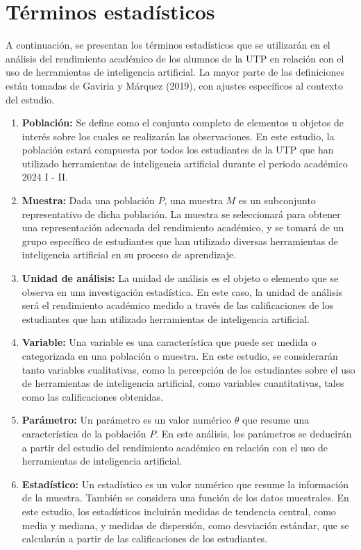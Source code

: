 \documentclass{article}
\begin{document}
\newpage

\section{Términos estadísticos}

A continuación, se presentan los términos estadísticos que se utilizarán en el análisis del rendimiento académico de los alumnos de la UTP en relación con el uso de herramientas de inteligencia artificial. La mayor parte de las definiciones están tomadas de Gaviria y Márquez (2019), con ajustes específicos al contexto del estudio.

\begin{enumerate}
  \item \textbf{Población:} Se define como el conjunto completo de elementos u objetos de interés sobre los cuales se realizarán las observaciones. En este estudio, la población estará compuesta por todos los estudiantes de la UTP que han utilizado herramientas de inteligencia artificial durante el periodo académico 2024 I - II.

  \item \textbf{Muestra:} Dada una población $P$, una muestra $M$ es un subconjunto representativo de dicha población. La muestra se seleccionará para obtener una representación adecuada del rendimiento académico, y se tomará de un grupo específico de estudiantes que han utilizado diversas herramientas de inteligencia artificial en su proceso de aprendizaje.

  \item \textbf{Unidad de análisis:} La unidad de análisis es el objeto o elemento que se observa en una investigación estadística. En este caso, la unidad de análisis será el rendimiento académico medido a través de las calificaciones de los estudiantes que han utilizado herramientas de inteligencia artificial.

  \item \textbf{Variable:} Una variable es una característica que puede ser medida o categorizada en una población o muestra. En este estudio, se considerarán tanto variables cualitativas, como la percepción de los estudiantes sobre el uso de herramientas de inteligencia artificial, como variables cuantitativas, tales como las calificaciones obtenidas.

  \item \textbf{Parámetro:} Un parámetro es un valor numérico $\theta$ que resume una característica de la población $P$. En este análisis, los parámetros se deducirán a partir del estudio del rendimiento académico en relación con el uso de herramientas de inteligencia artificial.

  \item \textbf{Estadístico:} Un estadístico es un valor numérico que resume la información de la muestra. También se considera una función de los datos muestrales. En este estudio, los estadísticos incluirán medidas de tendencia central, como media y mediana, y medidas de dispersión, como desviación estándar, que se calcularán a partir de las calificaciones de los estudiantes.
\end{enumerate}
\end{document}
